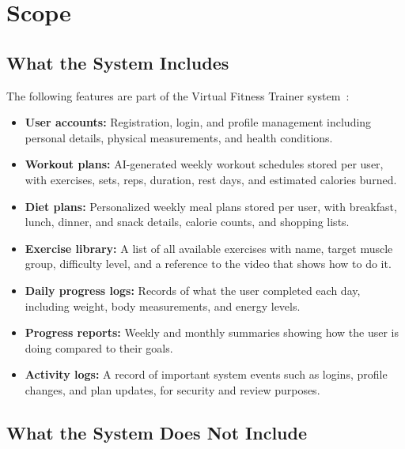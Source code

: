\documentclass[12pt,a4paper]{article}
\begin{document}
\section{Scope}

\subsection{What the System Includes}

The following features are part of the Virtual Fitness Trainer system~\cite{srs,proposal}:

\begin{itemize}[leftmargin=*]
  \item \textbf{User accounts:} Registration, login, and profile management including
  personal details, physical measurements, and health conditions.

  \item \textbf{Workout plans:} AI-generated weekly workout schedules stored per user,
  with exercises, sets, reps, duration, rest days, and estimated calories burned.

  \item \textbf{Diet plans:} Personalized weekly meal plans stored per user, with
  breakfast, lunch, dinner, and snack details, calorie counts, and shopping lists.

  \item \textbf{Exercise library:} A list of all available exercises with name, target
  muscle group, difficulty level, and a reference to the video that shows how to do it.

  \item \textbf{Daily progress logs:} Records of what the user completed each day,
  including weight, body measurements, and energy levels.

  \item \textbf{Progress reports:} Weekly and monthly summaries showing how the user
  is doing compared to their goals.

  \item \textbf{Activity logs:} A record of important system events such as logins,
  profile changes, and plan updates, for security and review purposes.
\end{itemize}

\subsection{What the System Does Not Include}
\end{document}
